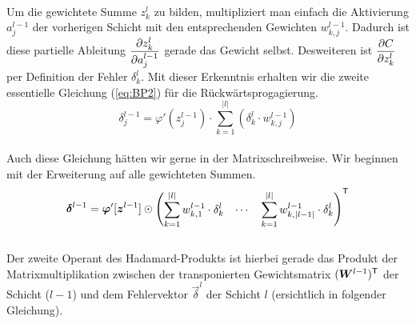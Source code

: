\begin{appendices}
\begin{equation}
\end{equation}
\\
Um die gewichtete Summe $z_k^l$ zu bilden, multipliziert man einfach die
Aktivierung $a_j^{l-1}$ der vorherigen Schicht mit den entsprechenden Gewichten $w_{k,j}^{l-1}$.
Dadurch ist diese partielle Ableitung $\displaystyle\frac{\partial z_k^l}{\partial a_j^{l-1}}$ gerade das
Gewicht selbst. Desweiteren ist $\displaystyle\frac{\partial C}{\partial z_k^l}$ per Definition der
Fehler $\delta_k^l$. Mit dieser Erkenntnis erhalten wir die zweite essentielle
Gleichung (\ref{eq:BP2}) für die Rückwärtsprogagierung.
\\
\begin{equation}\tag{BP2}\label{eq:BP2}
  \delta_j^{l-1} = \varphi'(z_j^{l-1}) \cdot \sum_{k=1}^{|l|} \left( \delta_k^l \cdot w_{k,j}^{l-1} \right)
\end{equation}
\\
Auch diese Gleichung hätten wir gerne in der Matrixschreibweise. Wir beginnen
mit der Erweiterung auf alle gewichteten Summen.
\\
\begin{equation*}
  \bm{\delta}^{l-1} = \bm{\varphi}'[\bm{z}^{l-1}] \odot \begin{pmatrix} \displaystyle\sum_{k=1}^{|l|} w_{k,1}^{l-1} \cdot \delta_k^l & \cdots & \displaystyle\sum_{k=1}^{|l|} w_{k,|l-1|}^{l-1} \cdot \delta_k^l \end{pmatrix}^{\mathsf{T}}
\end{equation*}
\\
Der zweite Operant des Hadamard-Produkts ist hierbei gerade das Produkt der
Matrixmultiplikation zwischen
der transponierten Gewichtsmatrix $(\bm{W}^{l-1})^{\mathsf{T}}$ der Schicht ($l-1$)
und dem Fehlervektor $\vec{\delta}^l$ der Schicht $l$ (ersichtlich in folgender Gleichung).


\end{appendices}
